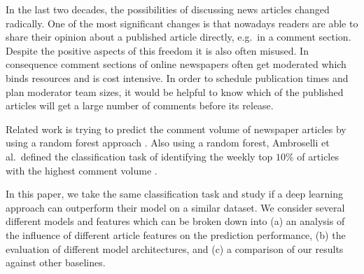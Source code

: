 In the last two decades, the possibilities of discussing news articles changed radically.
One of the most significant changes is that nowadays readers are able to share their opinion about a published article directly, e.g.\ in a comment section.
Despite the positive aspects of this freedom it is also often misused.
In consequence comment sections of online newspapers often get moderated which binds resources and is cost intensive.
In order to schedule publication times and plan moderator team sizes, it would be helpful to know which of the published articles will get a large number of comments before its release.

Related work is trying to predict the comment volume of newspaper articles by using a random forest approach \cite{tsagkias2009predicting}.
Also using a random forest, Ambroselli et al.\ defined the classification task of identifying the weekly top $10\%$ of articles with the highest comment volume \cite{ambroselli2018prediction}.

In this paper, we take the same classification task and study if a deep learning approach can outperform their model on a similar dataset.
We consider several different models and features which can be broken down into (a) an analysis of the influence of different article features on the prediction performance, (b) the evaluation of different model architectures, and (c) a comparison of our results against other baselines.
